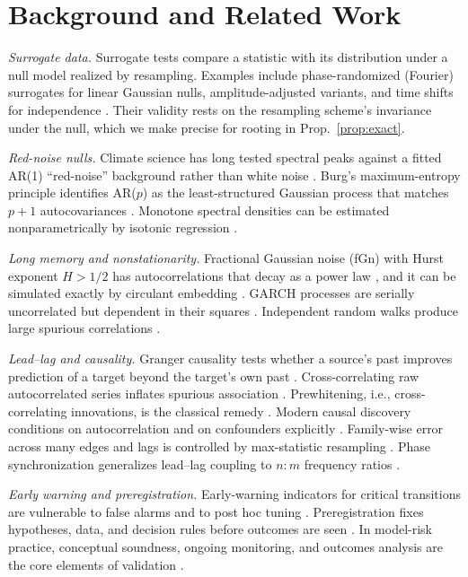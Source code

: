 \documentclass[10pt,twocolumn,letterpaper]{article}
\theoremstyle{definition}
\theoremstyle{remark}
\begin{document}
\section{Background and Related Work}

\textit{Surrogate data.} Surrogate tests compare a statistic with its
distribution under a null model realized by resampling. Examples include
phase-randomized (Fourier) surrogates for linear Gaussian nulls,
amplitude-adjusted variants, and time shifts for independence
\cite{theiler,schreiber,lancaster}. Their validity rests on the resampling
scheme's invariance under the null, which we make precise for rooting in
Prop.~\ref{prop:exact}.

\textit{Red-noise nulls.} Climate science has long tested spectral peaks against
a fitted AR(1) ``red-noise'' background rather than white noise
\cite{gilman,mannlees,torrence}. Burg's maximum-entropy principle identifies
AR($p$) as the least-structured Gaussian process that matches $p+1$
autocovariances \cite{burg}. Monotone spectral densities can be estimated
nonparametrically by isotonic regression \cite{barlow,anevski}.

\textit{Long memory and nonstationarity.} Fractional Gaussian noise (fGn) with
Hurst exponent $H>1/2$ has autocorrelations that decay as a power law
\cite{mandelbrot}, and it can be simulated exactly by circulant embedding
\cite{daviesharte}. GARCH processes are serially uncorrelated but dependent in
their squares \cite{bollerslev}. Independent random walks produce large
spurious correlations \cite{grangernewbold}.

\textit{Lead--lag and causality.} Granger causality tests whether a source's
past improves prediction of a target beyond the target's own past
\cite{granger}. Cross-correlating raw autocorrelated series inflates spurious
association \cite{bartlett}. Prewhitening, i.e., cross-correlating innovations,
is the classical remedy \cite{boxjenkins,haugh}. Modern causal discovery
conditions on autocorrelation and on confounders explicitly \cite{pcmci}.
Family-wise error across many edges and lags is controlled by max-statistic
resampling \cite{westfall}. Phase synchronization generalizes lead--lag
coupling to $n{:}m$ frequency ratios \cite{rosenblum}.

\textit{Early warning and preregistration.} Early-warning indicators for
critical transitions \cite{scheffer,dakos} are vulnerable to false alarms and to
post hoc tuning \cite{ditlevsen,boettiger}. Preregistration fixes hypotheses,
data, and decision rules before outcomes are seen \cite{nosek}. In model-risk
practice, conceptual soundness, ongoing monitoring, and outcomes analysis are
the core elements of validation \cite{sr117}.
\end{document}
